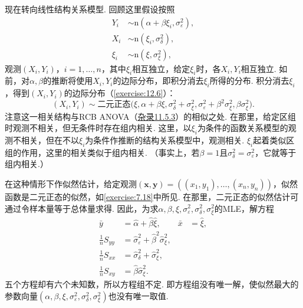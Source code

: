 现在转向线性结构关系模型. 回顾这里假设按照
$$\begin{aligned}Y_i&\sim\mathrm n(\alpha+\beta\xi_i,\sigma_\varepsilon^2),\\
X_i&\sim\mathrm n(\xi_i,\sigma_\delta^2),\\
\xi_i&\sim\mathrm n(\xi,\sigma_\xi^2),
\end{aligned}$$
观测$(X_i,Y_i)$，$i=1,\ldots,n$，其中$\xi_i$相互独立，给定$\xi_i$时，各$X_i,Y_i$相互独立. 如前，对$\alpha,\beta$的推断将使用$X_i,Y_i$的边际分布，即积分消去$\xi_i$所得的分布.
积分消去$\xi_i$，得到$(X_i,Y_i)$的边际分布（\autoref{exercise:12.6}）：
\begin{equation}\label{eq:12.2.19}
(X_i,Y_i)\sim\text{二元正态}\bigl(\xi,\alpha+\beta\xi,\sigma_\delta^2+\sigma_\xi^2,
\sigma_\varepsilon^2+\beta^2\sigma_\xi^2,\beta\sigma_\xi^2\bigr).
\end{equation}
注意这一相关结构与RCB ANOVA（\hyperref[sec:11.5.3]{杂录11.5.3}）的相似之处. 在那里，给定区组时观测不相关，但无条件时存在组内相关. 这里，以$\xi_i$为条件的函数关系模型的观测不相关，但在不以$\xi_i$为条件作推断的结构关系模型中，观测相关. $\xi_i$起着类似区组的作用，这里的相关类似于组内相关. （事实上，若$\beta=1$且$\sigma_\delta^2=\sigma_\varepsilon^2$，它就等于组内相关.）

在这种情形下作似然估计，给定观测$(\boldsymbol x,\boldsymbol y)=((x_1,y_1),\allowbreak\ldots,\allowbreak(x_n,y_n))$，似然函数是二元正态的似然，如\autoref{exercise:7.18}中所见. 在那里，二元正态的似然估计可通过令样本量等于总体量求得. 因此，为求$\alpha,\beta,\xi,\sigma_\varepsilon^2,\sigma_\delta^2,\sigma_\xi^2$的MLE，解方程
\begin{equation}\label{eq:12.2.20}
\begin{aligned}
\bar y&=\hat\alpha+\hat\beta\hat\xi,&\bar x&=\hat\xi,\\
\frac1nS_{yy}&=\hat\sigma_\varepsilon^2+\hat\beta^2\hat\sigma_\xi^2,\\
\frac1nS_{xx}&=\hat\sigma_\delta^2+\hat\sigma_\xi^2,\\
\frac1nS_{xy}&=\hat\beta\hat\sigma_\xi^2.
\end{aligned}
\end{equation}
五个方程却有六个未知数，所以方程组不定. 即方程组没有唯一解，使似然最大的参数向量$(\alpha,\beta,\xi,\sigma_\varepsilon^2,\sigma_\delta^2,\sigma_\xi^2)$也没有唯一取值.

